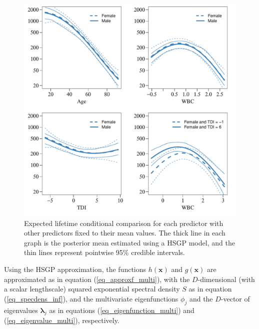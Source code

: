 \documentclass[onecolumn,a4paper,11pt]{article}
\DeclareMathOperator{\GP}{\mathcal{GP}}
\begin{document}


\begin{figure}
\centering
\includegraphics[scale=0.70, trim = 0mm 0mm 0mm 0mm, clip]{ch5_fig21_posteriors_leukemia_02.pdf}
\caption{Expected lifetime conditional comparison for each predictor with other predictors fixed to their mean values. The thick line in each graph is the posterior mean estimated using a HSGP model, and the thin lines represent pointwise 95\% credible intervals.}
  \label{ch5_fig21_posteriors_leukemia}
\end{figure}

Using the HSGP approximation, the functions $h(\bm{x})$ and $g(\bm{x})$ are approximated as in equation (\ref{eq_approxf_multi}), with the $D$-dimensional (with a scalar lengthscale) squared exponential spectral density $S$ as in equation (\ref{eq_specdens_inf}), and the multivariate eigenfunctions $\phi_j$ and the $D$-vector of eigenvalues $\bm{\lambda}_j$ as in equations (\ref{eq_eigenfunction_multi}) and  (\ref{eq_eigenvalue_multi}), respectively.
\end{document}
